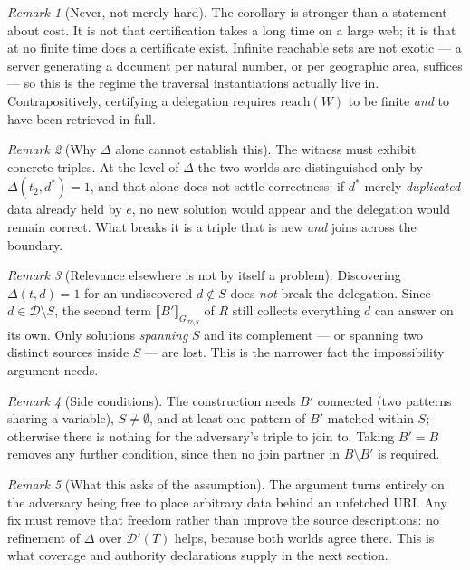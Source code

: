 \documentclass[11pt,a4paper]{article}
\theoremstyle{definition}
\theoremstyle{plain}
\theoremstyle{remark}
\newtheorem*{remark}{Remark}
\newcommand{\Dd}{\mathcal{D}}
\newcommand{\reach}{\mathrm{reach}}
\newcommand{\ev}[2]{\llbracket #1 \rrbracket_{#2}}
\begin{document}
\begin{remark}[Never, not merely hard]
The corollary is stronger than a statement about cost. It is not that certification takes
a long time on a large web; it is that at no finite time does a certificate exist. Infinite
reachable sets are not exotic --- a server generating a document per natural number, or
per geographic area, suffices --- so this is the regime the traversal instantiations
actually live in. Contrapositively, certifying a delegation requires $\reach(W)$ to be
finite \emph{and} to have been retrieved in full.
\end{remark}

\begin{remark}[Why $\Delta$ alone cannot establish this]
The witness must exhibit concrete triples. At the level of $\Delta$ the two worlds are
distinguished only by $\Delta(t_2, d^{*}) = 1$, and that alone does not settle
correctness: if $d^{*}$ merely \emph{duplicated} data already held by $e$, no new
solution would appear and the delegation would remain correct. What breaks it is a
triple that is new \emph{and} joins across the boundary.
\end{remark}

\begin{remark}[Relevance elsewhere is not by itself a problem]
Discovering $\Delta(t, d) = 1$ for an undiscovered $d \notin S$ does \emph{not} break the
delegation. Since $d \in \Dd \setminus S$, the second term $\ev{B'}{G_{\Dd \setminus S}}$
of $R$ still collects everything $d$ can answer on its own. Only solutions
\emph{spanning} $S$ and its complement --- or spanning two distinct sources inside $S$
--- are lost. This is the narrower fact the impossibility argument needs.
\end{remark}

\begin{remark}[Side conditions]
The construction needs $B'$ connected (two patterns sharing a variable), $S \neq
\emptyset$, and at least one pattern of $B'$ matched within $S$; otherwise there is
nothing for the adversary's triple to join to. Taking $B' = B$ removes any further
condition, since then no join partner in $B \setminus B'$ is required.
\end{remark}

\begin{remark}[What this asks of the assumption]
The argument turns entirely on the adversary being free to place arbitrary data behind an
unfetched URI. Any fix must remove that freedom rather than improve the source
descriptions: no refinement of $\Delta$ over $\Dd'(T)$ helps, because both worlds agree
there. This is what coverage and authority declarations supply in the next section.
\end{remark}
\end{document}
